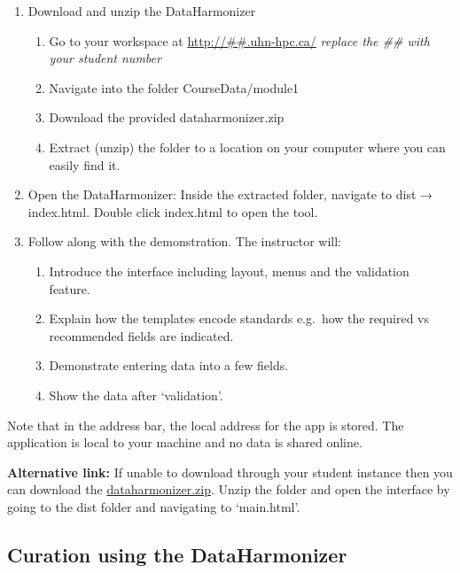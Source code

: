 \documentclass[
]{book}
\providecommand{\tightlist}{%
  \setlength{\itemsep}{0pt}\setlength{\parskip}{0pt}}
\begin{document}
\begin{enumerate}
\def\labelenumi{\arabic{enumi}.}
\tightlist
\item
  Download and unzip the DataHarmonizer

  \begin{enumerate}
  \def\labelenumii{\roman{enumii}.}
  \tightlist
  \item
    Go to your workspace at \url{http://\#\#.uhn-hpc.ca/} \emph{replace the \#\# with your student number}
  \item
    Navigate into the folder CourseData/module1
  \item
    Download the provided dataharmonizer.zip
  \item
    Extract (unzip) the folder to a location on your computer where you can easily find it.
  \end{enumerate}
\item
  Open the DataHarmonizer: Inside the extracted folder, navigate to dist → index.html. Double click index.html to open the tool.
\item
  Follow along with the demonstration. The instructor will:

  \begin{enumerate}
  \def\labelenumii{\roman{enumii}.}
  \tightlist
  \item
    Introduce the interface including layout, menus and the validation feature.
  \item
    Explain how the templates encode standards e.g.~how the required vs recommended fields are indicated.
  \item
    Demonstrate entering data into a few fields.
  \item
    Show the data after `validation'.
  \end{enumerate}
\end{enumerate}

Note that in the address bar, the local address for the app is stored. The application is local to your machine and no data is shared online.

\textbf{Alternative link:} If unable to download through your student instance then you can download the \href{https://drive.google.com/uc?export=download&id=1mfLHfzPVOA6avBEoFhiAsIMfXuBrIMQp}{dataharmonizer.zip}. Unzip the folder and open the interface by going to the dist folder and navigating to `main.html'.

\subsection{Curation using the DataHarmonizer}\label{exercise3}
\end{document}
